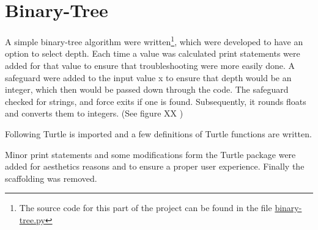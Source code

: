 \documentclass[titlepage]{article}
\begin{document}
\section{Binary-Tree}
A simple binary-tree algorithm were written\footnote{The source code for this part of the project can be found in the file \href{https://github.com/ErikAndersen81/DM550-FractalProject/blob/master/Working_binary_tree.py}{binary-tree.py}}, which were developed to have an option to select depth. Each time a value was calculated print statements were added for that value to ensure that troubleshooting were more easily done.  A safeguard were added to the input value x to ensure that depth would be an integer, which then would be passed down through the code. The safeguard checked for strings, and force exits if one is found. Subsequently, it rounds floats and converts them to integers. (See figure XX )

Following Turtle is imported and a few definitions of Turtle functions are written. 

Minor print statements and some modifications form the Turtle package were added for aesthetics reasons and to ensure a proper user experience.  Finally the scaffolding was removed. 
\end{document}
